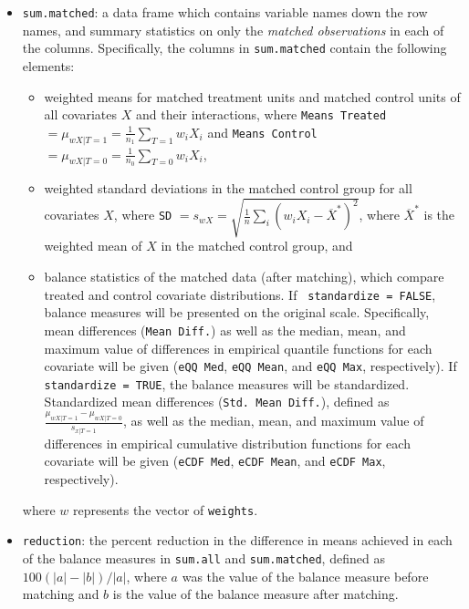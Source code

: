 \begin{itemize}
\item \texttt{sum.matched}: a data frame which contains variable names
  down the row names, and summary statistics on only the \emph{matched
    observations} in each of the columns.  Specifically, the columns
  in \texttt{sum.matched} contain the following elements:
  \begin{itemize}
  \item weighted means for matched treatment units and matched control units of all covariates
    $X$ and their interactions, where \texttt{Means Treated}$=
    \mu_{wX|T=1} = \frac{1}{n_1} \sum_{T=1} w_iX_i$ and \texttt{Means
      Control}$=\mu_{wX|T=0} = \frac{1}{n_0} \sum_{T=0} w_iX_i$,
  \item weighted standard deviations in the matched control group for
    all covariates $X$, where \texttt{SD} $= s_{wX} =
    \sqrt{\frac{1}{n} \sum_{i} (w_iX_i - \overline{X}^*)^2}$, where
    $\overline{X}^*$ is the weighted mean of $X$ in the matched
    control group, and
  \item balance statistics of the matched data (after matching), which
    compare treated and control covariate distributions. If {\tt
      standardize = FALSE}, balance measures will be presented on the
    original scale. Specifically, mean differences (\texttt{Mean
      Diff.}) as well as the median, mean, and maximum value of
    differences in empirical quantile functions for each covariate
    will be given (\texttt{eQQ Med}, \texttt{eQQ Mean}, and
    \texttt{eQQ Max}, respectively). If {\tt standardize = TRUE}, the
    balance measures will be standardized.  Standardized mean
    differences (\texttt{Std. Mean Diff.}), defined as
    $\frac{\mu_{wX|T=1} - \mu_{wX|T=0}}{s_{x|T=1}}$, as well as the
    median, mean, and maximum value of differences in empirical
    cumulative distribution functions for each covariate will be given
    (\texttt{eCDF Med}, \texttt{eCDF Mean}, and \texttt{eCDF Max},
    respectively).
  \end{itemize}
  where $w$ represents the vector of \texttt{weights}.
  
\item \texttt{reduction}: the percent reduction in the difference in
  means achieved in each of the balance measures in \texttt{sum.all}
  and \texttt{sum.matched}, defined as $100(|a|-|b|)/|a|$, where $a$
  was the value of the balance measure before matching and $b$ is the
  value of the balance measure after matching.
  

\end{itemize}
